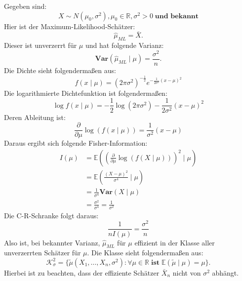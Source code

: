 \documentclass[10pt]{article}
\newcommand{\FZV}{X_1, \ldots, X_n} %
\newcommand{\IR}{\mathbb{R}} %
\newcommand{\EW}{\mathbb{E}} %
\newcommand{\Var}{\textbf{Var}} %
\newenvironment{BSP}[1][]
{\begin{Beispiel}[frametitle=#1]}{\end{Beispiel}}
\begin{document}
	\begin{BSP}[Beispiel 1.4.5 (Anwendung der C-R-Schranke Normalverteilung mit bekannter Varianz)]
		Gegeben sind:
		\begin{equation*}
			X \sim N(\mu_0, \sigma^2), \mu_0 \in \IR, \sigma^2 > 0 \; \textbf{und bekannt}
		\end{equation*}
		Hier ist der Maximum-Likelihood-Schätzer:
		\begin{equation*}
			\hat{\mu}_{ML} = \bar{X}. 
		\end{equation*}
		Dieser ist unverzerrt für $\mu$ und hat folgende Varianz:
		\begin{equation*}
			\Var(\hat{\mu}_{ML} \mid \mu) = \frac{\sigma^2}{n}.
		\end{equation*}
		Die Dichte sieht folgendermaßen aus:
		\begin{equation*}
			f(x \mid \mu) = (2\pi \sigma^2)^{-\frac{1}{2}} e^{-\frac{1}{2\sigma^2}(x-\mu)^2}
		\end{equation*}
		Die logarithmierte Dichtefunktion ist folgendermaßen:
		\begin{equation*}
			\log f(x \mid \mu) = -\frac{1}{2} \log (2\pi \sigma^2) - \frac{1}{2 \sigma^2} (x-\mu)^2
		\end{equation*}
		Deren Ableitung ist:
		\begin{equation*}
			\frac{\partial}{\partial \mu} \log(f(x \mid \mu)) = \frac{1}{\sigma^2} (x-\mu)
		\end{equation*}
		Daraus ergibt sich folgende Fisher-Information:
		\begin{equation*}
			\begin{split}
				I(\mu) &= \EW\left(\left(\frac{\partial}{\partial \mu } \log(f(X \mid \mu)) \right) ^2 \mid \mu \right)\\
				&= \EW\left(\frac{(X-\mu)^2}{\sigma^4} \mid \mu \right)\\
				&= \frac{1}{\sigma^4} \Var(X \mid \mu)\\
				&= \frac{\sigma^2}{\sigma^4} = \frac{1}{\sigma^2}
			\end{split} 
		\end{equation*}
		Die C-R-Schranke folgt daraus:
		\begin{equation*}
			\frac{1}{nI(\mu)}= \frac{\sigma^2}{n}
		\end{equation*}
		Also ist, bei bekannter Varianz, $\hat{\mu}_{ML}$ für $\mu$ effizient in der Klasse aller unverzerrten Schätzer für $\mu$. 
		Die Klasse sieht folgendermaßen aus:
		\begin{equation*}
			\mathcal{K}_\sigma^2 = \{\tilde{\mu}(\FZV, \sigma^2): \forall \mu \in \IR \; \textbf{ist} \; \EW(\tilde{\mu} \mid \mu) = \mu\}.
		\end{equation*}
		Hierbei ist zu beachten, dass der effiziente Schätzer $\bar{X}_n$ nicht von $\sigma^2$ abhängt. 
	\end{BSP}
\end{document}
